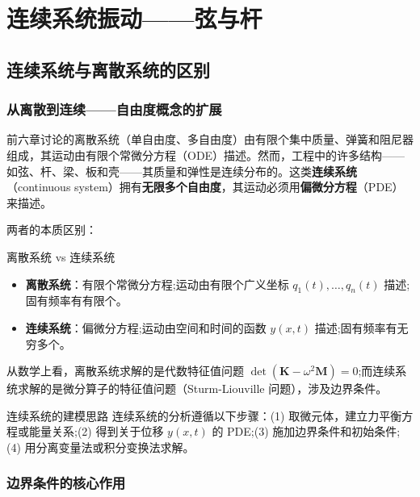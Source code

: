 
\chapter{连续系统振动——弦与杆}


\section{连续系统与离散系统的区别}

\subsection{从离散到连续——自由度概念的扩展}

前六章讨论的离散系统（单自由度、多自由度）由有限个集中质量、弹簧和阻尼器组成，其运动由有限个常微分方程（ODE）描述。然而，工程中的许多结构——如弦、杆、梁、板和壳——其质量和弹性是连续分布的。这类\textbf{连续系统}（continuous system）拥有\textbf{无限多个自由度}，其运动必须用\textbf{偏微分方程}（PDE）来描述。

两者的本质区别：

\begin{mydefinition}{离散系统 vs 连续系统}
\begin{itemize}
\item \textbf{离散系统}：有限个常微分方程;运动由有限个广义坐标 $q_1(t),\dots,q_n(t)$ 描述;固有频率有有限个。
\item \textbf{连续系统}：偏微分方程;运动由空间和时间的函数 $y(x,t)$ 描述;固有频率有无穷多个。
\end{itemize}
\end{mydefinition}

从数学上看，离散系统求解的是代数特征值问题 $\det(\mathbf{K} - \omega^2\mathbf{M})=0$;而连续系统求解的是微分算子的特征值问题（Sturm-Liouville 问题），涉及边界条件。

\begin{mydefinition}{连续系统的建模思路}
连续系统的分析遵循以下步骤：(1) 取微元体，建立力平衡方程或能量关系;(2) 得到关于位移 $y(x,t)$ 的 PDE;(3) 施加边界条件和初始条件;(4) 用分离变量法或积分变换法求解。
\end{mydefinition}

\subsection{边界条件的核心作用}

